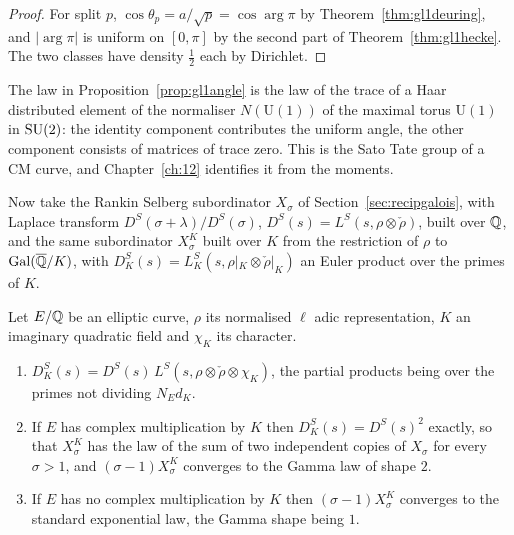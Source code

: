 \begin{proof}
For split $p$, $\cos\theta_p=a/\sqrt p=\cos\arg\pi$ by Theorem~\ref{thm:gl1deuring}, and $|\arg\pi|$ is uniform on $[0,\pi]$ by the second part of Theorem~\ref{thm:gl1hecke}. The two classes have density $\frac12$ each by Dirichlet.
\end{proof}

The law in Proposition~\ref{prop:gl1angle} is the law of the trace of a Haar distributed element of the normaliser $N(\mathrm{U}(1))$ of the maximal torus $\mathrm{U}(1)$ in $\mathrm{SU}(2)$: the identity component contributes the uniform angle, the other component consists of matrices of trace zero. This is the Sato Tate group of a CM curve, and Chapter~\ref{ch:12} identifies it from the moments.

Now take the Rankin Selberg subordinator $X_\sigma$ of Section~\ref{sec:recipgalois}, with Laplace transform $D^S(\sigma+\lambda)/D^S(\sigma)$, $D^S(s)=L^S(s,\rho\otimes\check\rho)$, built over $\mathbb{Q}$, and the same subordinator $X^K_\sigma$ built over $K$ from the restriction of $\rho$ to $\operatorname{Gal}(\overline{\mathbb{Q}}/K)$, with $D^S_K(s)=L^S_K(s,\rho|_K\otimes\check\rho|_K)$ an Euler product over the primes of $K$.

\begin{theorem}\label{thm:gl1cmshape}
Let $E/\mathbb{Q}$ be an elliptic curve, $\rho$ its normalised $\ell$ adic representation, $K$ an imaginary quadratic field and $\chi_K$ its character.
\begin{enumerate}
\item[(i)] $D^S_K(s)=D^S(s)\,L^S(s,\rho\otimes\check\rho\otimes\chi_K)$, the partial products being over the primes not dividing $N_E d_K$.
\item[(ii)] If $E$ has complex multiplication by $K$ then $D^S_K(s)=D^S(s)^2$ exactly, so that $X^K_\sigma$ has the law of the sum of two independent copies of $X_\sigma$ for every $\sigma>1$, and $(\sigma-1)X^K_\sigma$ converges to the Gamma law of shape $2$.
\item[(iii)] If $E$ has no complex multiplication by $K$ then $(\sigma-1)X^K_\sigma$ converges to the standard exponential law, the Gamma shape being $1$.
\end{enumerate}
\end{theorem}

